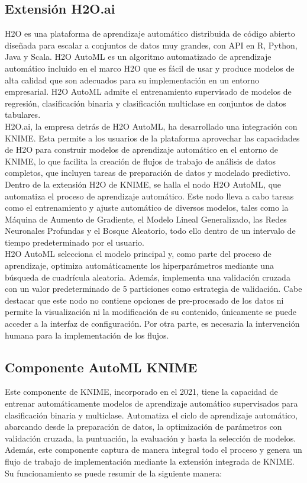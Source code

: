 \subsection{Extensión H2O.ai}
H2O es una plataforma de aprendizaje automático distribuida de código abierto diseñada para escalar a conjuntos de datos muy grandes, con API en R, Python, Java y Scala. H2O AutoML \citep{ledell2020h2o} es un algoritmo automatizado de aprendizaje automático incluido en el marco H2O que es fácil de usar y produce modelos de alta calidad que son adecuados para su implementación en un entorno empresarial. H2O AutoML admite el entrenamiento supervisado de modelos de regresión, clasificación binaria y clasificación multiclase en conjuntos de datos tabulares.\\
H2O.ai, la empresa detrás de H2O AutoML, ha desarrollado una integración con KNIME. Esta permite a los usuarios de la plataforma aprovechar las capacidades de H2O para construir modelos de aprendizaje automático en el entorno de KNIME, lo que facilita la creación de flujos de trabajo de análisis de datos completos, que incluyen tareas de preparación de datos y modelado predictivo. Dentro de la extensión H2O de KNIME, se halla el nodo H2O AutoML, que automatiza el proceso de aprendizaje automático. Este nodo lleva a cabo tareas como el entrenamiento y ajuste automático de diversos modelos, tales como la Máquina de Aumento de Gradiente, el Modelo Lineal Generalizado, las Redes Neuronales Profundas y el Bosque Aleatorio, todo ello dentro de un intervalo de tiempo predeterminado por el usuario. \\
H2O AutoML selecciona el modelo principal y, como parte del proceso de aprendizaje, optimiza automáticamente los hiperparámetros mediante una búsqueda de cuadrícula aleatoria. Además, implementa una validación cruzada con un valor predeterminado de 5 particiones como estrategia de validación. Cabe destacar que este nodo no contiene opciones de pre-procesado de los datos ni permite la visualización ni la modificación de su contenido, únicamente se puede acceder a la interfaz de configuración. Por otra parte, es necesaria la intervención humana para la implementación de los flujos.

\subsection{Componente AutoML KNIME}
Este componente de KNIME, incorporado en el 2021, tiene la capacidad de entrenar automáticamente modelos de aprendizaje automático supervisados para clasificación binaria y multiclase. Automatiza el ciclo de aprendizaje automático, abarcando desde la preparación de datos, la optimización de parámetros con validación cruzada, la puntuación, la evaluación y hasta la selección de modelos. Además, este componente captura de manera integral todo el proceso y genera un flujo de trabajo de implementación mediante la extensión integrada de KNIME. Su funcionamiento se puede resumir de la siguiente manera:


